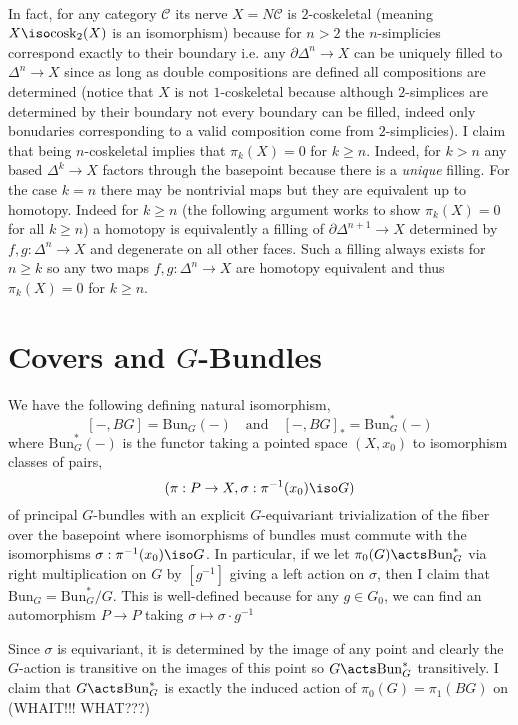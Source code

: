 \documentclass[12pt]{extarticle}
\newcommand{\Bun}{\mathrm{Bun}}
\begin{document}
\bigskip\\
In fact, for any category $\mathcal{C}$ its nerve $X = N \mathcal{C}$ is $2$-coskeletal (meaning $X \iso \mathrm{cosk}_2(X)$ is an isomorphism) because for $n > 2$ the $n$-simplicies correspond exactly to their boundary i.e. any $\partial \Delta^n \to X$ can be uniquely filled to $\Delta^n \to X$ since as long as double compositions are defined all compositions are determined (notice that $X$ is not $1$-coskeletal because although $2$-simplices are determined by their boundary not every boundary can be filled, indeed only bonudaries corresponding to a valid composition come from $2$-simplicies). I claim that being $n$-coskeletal implies that $\pi_k(X) = 0$ for $k \ge n$. Indeed, for $k > n$ any based $\Delta^k \to X$ factors through the basepoint because there is a \textit{unique} filling. For the case $k = n$ there may be nontrivial maps but they are equivalent up to homotopy. Indeed for $k \ge n$ (the following argument works to show $\pi_k(X) = 0$ for all $k \ge n$) a homotopy is equivalently a filling of $\partial \Delta^{n+1} \to X$ 
determined by $f,g : \Delta^n \to X$ and degenerate on all other faces. Such a filling always exists for $n \ge k$ so any two maps $f,g : \Delta^n \to X$ are homotopy equivalent and thus $\pi_k(X) = 0$ for $k \ge n$. 

\section{Covers and $G$-Bundles}

We have the following defining natural isomorphism,
\[ [-, BG] = \Bun_G(-) \quad \text{and} \quad [-, BG]_* = \Bun^*_G(-) \]
where $\Bun^*_G(-)$ is the functor taking a pointed space $(X, x_0)$ to isomorphism classes of pairs,
\[ (\pi : P \to X, \sigma : \pi^{-1}(x_0) \iso G) \]
of principal $G$-bundles with an explicit $G$-equivariant trivialization of the fiber over the basepoint where isomorphisms of bundles must commute with the isomorphisms $\sigma : \pi^{-1}(x_0) \iso G$. In particular, if we let $\pi_0(G) \acts \Bun^*_G$ via right multiplication on $G$ by $[g^{-1}]$ giving a left action on $\sigma$, then I claim that $\Bun_G = \Bun_G^* / G$. This is well-defined because for any $g \in G_0$, we can find an automorphism $P \to P$ taking $\sigma \mapsto \sigma \cdot g^{-1}$

Since $\sigma$ is equivariant, it is determined by the image of any point and clearly the $G$-action is transitive on the images of this point so $G \acts \Bun_G^*$ transitively. I claim that $G \acts \Bun_G^*$ is exactly the induced action of $\pi_0(G) = \pi_1(BG)$ on 
(WHAIT!!! WHAT???)
\end{document}
